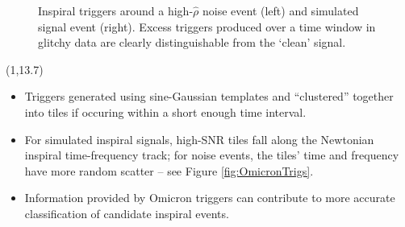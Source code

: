 \documentclass[a0,portrait]{a0poster}
\newcommand{\headingcolor}{\color{BannerSixColor}}
\def\LHead#1{\noindent{\LARGE \bf \headingcolor \texttt{#1}}\smallskip}
\begin{document}
\begin{textblock}{8}
\begin{figure}
{  }
\vspace*{-1cm}
\caption{Inspiral triggers around a high-$\hat{\rho}$ noise event (left) and simulated signal event (right). %
Excess triggers produced over a time window in glitchy data are clearly distinguishable from the `clean' signal.
}

\label{fig:InspiralTrigs}
\end{figure}

\end{textblock}

\begin{textblock}{8}(1,13.7)
  \LHead{Omicron Triggers}

\begin{itemize}
\item Triggers generated using sine-Gaussian templates and ``clustered'' together into tiles if occuring within a short enough time interval.
\item For simulated inspiral signals, high-SNR tiles fall along the Newtonian inspiral time-frequency track; for noise events, the tiles' time and frequency have more random scatter -- see Figure \ref{fig:OmicronTrigs}.
\item Information provided by Omicron triggers can contribute to more accurate classification of candidate inspiral events.
\end{itemize}
  

\end{textblock}
\end{document}
